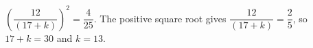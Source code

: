 $(\dfrac{12}{(17+k)})^2=\dfrac{4}{25}$. The positive square root gives $\dfrac{12}{(17+k)}=\dfrac{2}{5}$, so $17+k=30$ and $\boxed{k=13}$.
